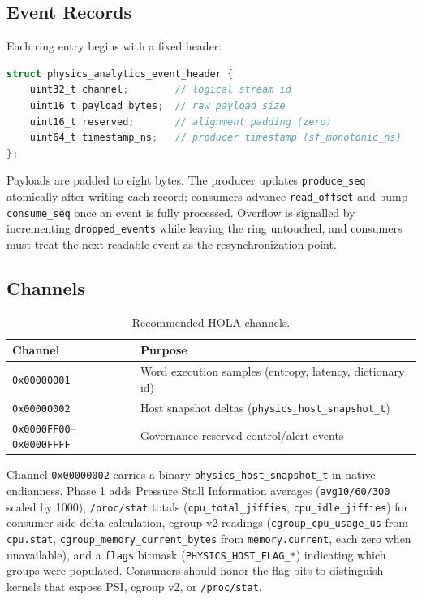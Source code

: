 \subsection{Event Records}

Each ring entry begins with a fixed header:

\begin{lstlisting}[language=C]
struct physics_analytics_event_header {
    uint32_t channel;        // logical stream id
    uint16_t payload_bytes;  // raw payload size
    uint16_t reserved;       // alignment padding (zero)
    uint64_t timestamp_ns;   // producer timestamp (sf_monotonic_ns)
};
\end{lstlisting}

Payloads are padded to eight bytes. The producer updates \texttt{produce\_seq}
atomically after writing each record; consumers advance \texttt{read\_offset}
and bump \texttt{consume\_seq} once an event is fully processed. Overflow is
signalled by incrementing \texttt{dropped\_events} while leaving the ring
untouched, and consumers must treat the next readable event as the
resynchronization point.

\subsection{Channels}

\begin{table}[h]
\centering
\begin{tabular}{ll}
\toprule
Channel & Purpose \\
\midrule
\texttt{0x00000001} & Word execution samples (entropy, latency, dictionary id) \\
\texttt{0x00000002} & Host snapshot deltas (\texttt{physics\_host\_snapshot\_t}) \\
\texttt{0x0000FF00}--\texttt{0x0000FFFF} & Governance-reserved control/alert events \\
\bottomrule
\end{tabular}
\caption{Recommended HOLA channels.}
\end{table}

Channel \texttt{0x00000002} carries a binary \texttt{physics\_host\_snapshot\_t}
in native endianness. Phase 1 adds Pressure Stall Information averages
(\texttt{avg10/60/300} scaled by 1000), \texttt{/proc/stat} totals
(\texttt{cpu\_total\_jiffies}, \texttt{cpu\_idle\_jiffies}) for consumer-side
delta calculation, cgroup v2 readings (\texttt{cgroup\_cpu\_usage\_us} from
\texttt{cpu.stat}, \texttt{cgroup\_memory\_current\_bytes} from
\texttt{memory.current}, each zero when unavailable), and a \texttt{flags}
bitmask (\texttt{PHYSICS\_HOST\_FLAG\_*}) indicating which groups were
populated. Consumers should honor the flag bits to distinguish kernels that
expose PSI, cgroup v2, or \texttt{/proc/stat}.

